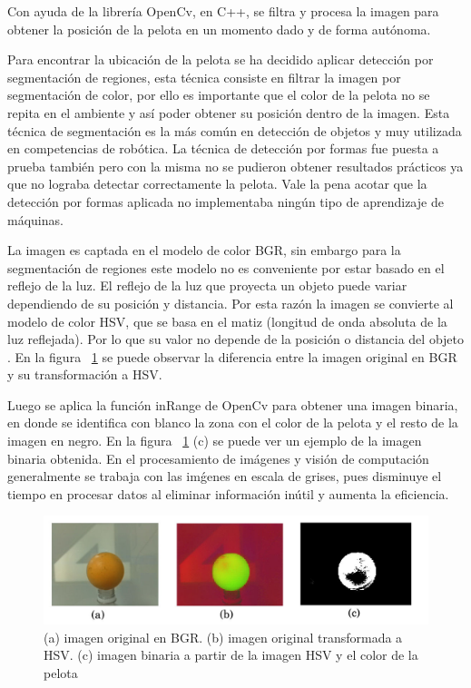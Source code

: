 Con ayuda de la librería OpenCv, en \gls{C++}, se filtra y procesa la imagen para obtener la posición de la pelota en un momento dado y de forma autónoma. 

Para encontrar la ubicación de la pelota  se ha decidido aplicar detección por segmentación de regiones, esta técnica consiste en filtrar la imagen por segmentaci\'on de color, por ello es importante que el color de la pelota no se repita en el ambiente y así poder obtener su posición dentro de la imagen. Esta t\'ecnica de segmentaci\'on es la m\'as com\'un en detecci\'on de objetos y muy utilizada en competencias de rob\'otica. La t\'ecnica de detecci\'on por  formas fue puesta a prueba tambi\'en pero con la misma no se pudieron obtener resultados pr\'acticos ya que no lograba detectar correctamente la pelota. Vale la pena acotar que la detecci\'on por formas aplicada no implementaba ning\'un tipo de aprendizaje de m\'aquinas.

La imagen es captada en el modelo de color \gls{BGR}, sin embargo para la segmentación de regiones este modelo no es conveniente por estar basado en el reflejo de la luz. El reflejo de la luz  que proyecta un objeto puede variar dependiendo de su posición y distancia. Por esta razón la imagen se convierte al modelo de color \gls{HSV}, que se basa en el matiz (longitud de onda absoluta de la luz reflejada). Por lo que su valor no depende de la posición o distancia del objeto \cite{AiRobotics}. En la figura ~\ref{fig:proces} se puede observar la diferencia entre la imagen original en BGR y su transformación a HSV.     

Luego se aplica la función inRange de OpenCv para obtener una imagen binaria, en donde se identifica con blanco la zona con el color de la pelota y el resto de la imagen en negro. En la figura ~\ref{fig:proces} (c) se puede ver un ejemplo de la imagen binaria obtenida. En el procesamiento de im\'agenes y visi\'on de computaci\'on generalmente se trabaja con las im\'genes en escala de grises, pues disminuye el tiempo en procesar datos al eliminar informaci\'on inútil y aumenta la eficiencia.

\begin{figure}[hbtp]
\centering
\includegraphics[scale=0.36]{imagenes/HSVyBinaria.jpg}
\caption{(a) imagen original en BGR. (b) imagen original transformada a HSV. (c) imagen binaria a partir de la imagen HSV y el color de la pelota}
\label{fig:proces}
\end{figure}

